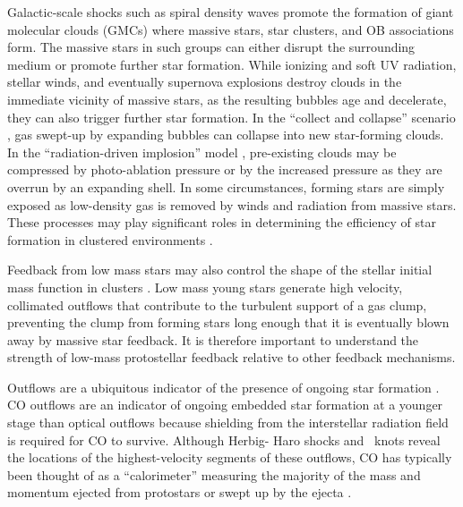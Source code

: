 Galactic-scale shocks such as spiral density waves promote the formation of
giant molecular clouds (GMCs) where massive stars, star clusters, and OB
associations form.  The massive stars in such groups can either disrupt the
surrounding medium or promote further star formation.  While ionizing and soft
UV radiation, stellar winds, and eventually supernova explosions destroy clouds
in the immediate vicinity of massive stars, as the resulting bubbles age and
decelerate, they can also trigger further star formation.  In the ``collect and
collapse'' scenario
\citep[e.g.][]{elmegreen:sequential:1977}, gas swept-up by expanding bubbles
can collapse into new star-forming clouds.  In the ``radiation-driven
implosion'' model \citep{bertoldi:cometary:1990,klein:implosion:1983},
pre-existing clouds may be compressed by photo-ablation pressure or by the
increased pressure as they are overrun by an expanding shell.  In some
circumstances, forming stars are simply exposed as low-density gas is removed
by winds and radiation from massive stars.  These processes may play significant roles in
determining the efficiency of star formation in clustered environments
\citep{elmegreen1998}.



Feedback from low mass stars may also control the shape of the stellar initial
mass function in clusters \citep{adams1996,Peters2010}.  Low mass young stars
generate high velocity, collimated outflows that contribute to the turbulent
support of a gas clump, preventing the clump from forming stars long enough
that it is eventually blown away by massive star feedback.  It is therefore
important to understand the strength of low-mass protostellar feedback relative
to other feedback mechanisms.

Outflows are a ubiquitous indicator of the presence of ongoing star formation
\citep{reipurth2001}.  CO outflows are an indicator of ongoing embedded star
formation at a younger stage than optical outflows because shielding from the
interstellar radiation field is required for CO to survive.  Although Herbig-
Haro shocks and \hh\ knots reveal the locations of the highest-velocity
segments of these outflows, CO has typically been thought of as a
``calorimeter'' measuring the majority of the mass and momentum ejected from
protostars or swept up by the ejecta \citep{Bachiller1996}.

